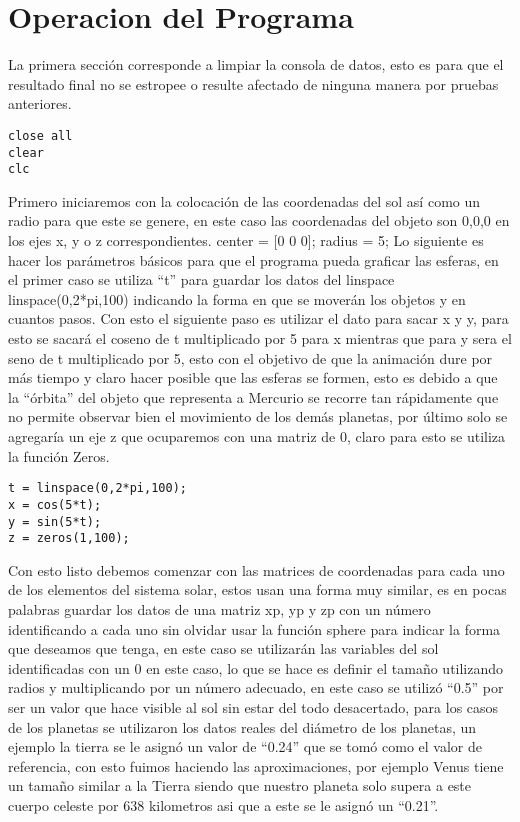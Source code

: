\documentclass[12pt]{article}
\begin{document}
\section{Operacion del Programa}
La primera sección corresponde a limpiar la consola de datos, esto es para que el resultado final no se estropee o resulte afectado de ninguna manera por pruebas anteriores.
	\begin{lstlisting}
close all
clear
clc
	\end{lstlisting}
Primero iniciaremos con la colocación de las coordenadas del sol así como un radio para que este se genere, en este caso las coordenadas del objeto son 0,0,0 en los ejes x, y o z correspondientes.
center = [0 0 0];
radius = 5;
Lo siguiente es hacer los parámetros básicos para que el programa pueda graficar las esferas, en el primer caso se utiliza “t” para guardar los datos del linspace linspace(0,2*pi,100) indicando la forma en que se moverán los objetos y en cuantos pasos. Con esto el siguiente paso es utilizar el dato para sacar x y y, para esto se sacará el coseno de t multiplicado por 5 para x mientras que para y sera el seno de t multiplicado por 5, esto con el objetivo de que la animación dure por más tiempo y claro hacer posible que las esferas se formen, esto es debido a que la “órbita” del objeto que representa a Mercurio se recorre tan rápidamente que no permite observar bien el movimiento de los demás planetas, por último solo se agregaría un eje z que ocuparemos con una matriz de 0, claro para esto se utiliza la función Zeros.
\begin{lstlisting}
t = linspace(0,2*pi,100);
x = cos(5*t);
y = sin(5*t);
z = zeros(1,100);
	\end{lstlisting}
Con esto listo debemos comenzar con las matrices de coordenadas para cada uno de los elementos del sistema solar, estos usan una forma muy similar, es en pocas palabras guardar los datos de una matriz xp, yp y zp con un número identificando a cada uno sin olvidar usar la función sphere para indicar la forma que deseamos que tenga, en este caso se utilizarán las variables del sol identificadas con un 0 en este caso, lo que se hace es definir el tamaño utilizando radios y multiplicando por un número adecuado, en este caso se utilizó “0.5” por ser un valor que hace visible al sol sin estar del todo desacertado, para los casos de los planetas se utilizaron los datos reales del diámetro de los planetas, un ejemplo la tierra se le asignó un valor de “0.24” que se tomó como el valor de referencia, con esto fuimos haciendo las aproximaciones, por ejemplo Venus tiene un tamaño similar a la Tierra siendo que nuestro planeta solo supera a este cuerpo celeste por 638 kilometros asi que a este se le asignó un “0.21”.
\end{document}
